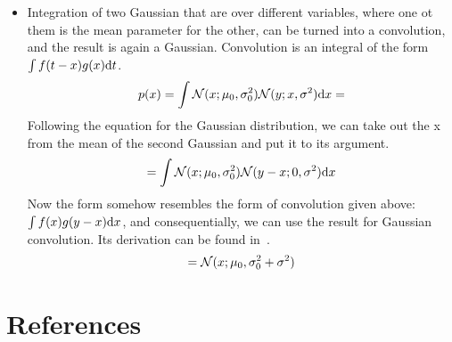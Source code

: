 \documentclass[12pt]{article}
\begin{document}
\begin{itemize}
  \item Integration of two Gaussian that are over different variables, where one ot them is the mean parameter for the other, can be turned into a convolution, and the result is again a Gaussian. Convolution is an integral of the form $\int f(t-x)g(x)\mathrm{d}t$.
    \begin{align}
      p(x) = \int \mathcal{N}(x; \mu_0, \sigma^2_0) \mathcal{N}(y; x, \sigma^2) \mathrm{d}x =
    \end{align}
    Following the equation for the Gaussian distribution, we can take out the x from the mean of the second Gaussian and put it to its argument.
    \begin{align}
      = \int \mathcal{N}(x; \mu_0, \sigma^2_0) \mathcal{N}(y - x; 0, \sigma^2) \mathrm{d}x \\
    \end{align}
    Now the form somehow resembles the form of convolution given above: $\int f(x) g(y - x)\mathrm{d}x$, and consequentially, we can use the result for Gaussian convolution. Its derivation can be found in~\cite{math_behind_trueskill}.
    \begin{align}
      = \mathcal{N}(x; \mu_0, \sigma^2_0 + \sigma^2) \\
    \end{align}
\end{itemize}

\section{References}


\end{document}
